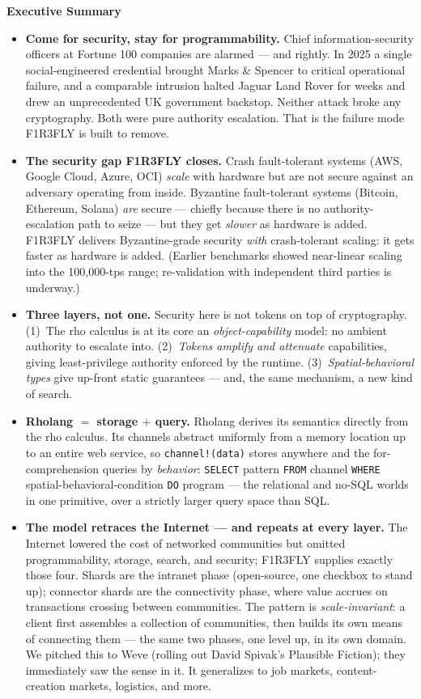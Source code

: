 \documentclass[11pt]{article}
\begin{document}
\begin{keybox}
\textbf{Executive Summary}
\begin{itemize}[leftmargin=1.2em, itemsep=4pt, topsep=4pt]
  \item \textbf{Come for security, stay for programmability.} Chief information-security officers at Fortune 100 companies are alarmed --- and rightly. In 2025 a single social-engineered credential brought Marks \& Spencer to critical operational failure, and a comparable intrusion halted Jaguar Land Rover for weeks and drew an unprecedented UK government backstop. Neither attack broke any cryptography. Both were pure authority escalation. That is the failure mode F1R3FLY is built to remove.
  \item \textbf{The security gap F1R3FLY closes.} Crash fault-tolerant systems (AWS, Google Cloud, Azure, OCI) \emph{scale} with hardware but are not secure against an adversary operating from inside. Byzantine fault-tolerant systems (Bitcoin, Ethereum, Solana) \emph{are} secure --- chiefly because there is no authority-escalation path to seize --- but they get \emph{slower} as hardware is added. F1R3FLY delivers Byzantine-grade security \emph{with} crash-tolerant scaling: it gets faster as hardware is added. (Earlier benchmarks showed near-linear scaling into the 100{,}000-tps range; re-validation with independent third parties is underway.)
  \item \textbf{Three layers, not one.} Security here is not tokens on top of cryptography. (1)~The rho calculus is at its core an \emph{object-capability} model: no ambient authority to escalate into. (2)~\emph{Tokens amplify and attenuate} capabilities, giving least-privilege authority enforced by the runtime. (3)~\emph{Spatial-behavioral types} give up-front static guarantees --- and, the same mechanism, a new kind of search.
  \item \textbf{Rholang $=$ storage $+$ query.} Rholang derives its semantics directly from the rho calculus. Its channels abstract uniformly from a memory location up to an entire web service, so \texttt{channel!(data)} stores anywhere and the for-comprehension queries by \emph{behavior}: \texttt{SELECT} pattern \texttt{FROM} channel \texttt{WHERE} spatial-behavioral-condition \texttt{DO} program --- the relational and no-SQL worlds in one primitive, over a strictly larger query space than SQL.
  \item \textbf{The model retraces the Internet --- and repeats at every layer.} The Internet lowered the cost of networked communities but omitted programmability, storage, search, and security; F1R3FLY supplies exactly those four. Shards are the intranet phase (open-source, one checkbox to stand up); connector shards are the connectivity phase, where value accrues on transactions crossing between communities. The pattern is \emph{scale-invariant}: a client first assembles a collection of communities, then builds its own means of connecting them --- the same two phases, one level up, in its own domain. We pitched this to Weve (rolling out David Spivak's Plausible Fiction); they immediately saw the sense in it. It generalizes to job markets, content-creation markets, logistics, and more.

\end{itemize}
\end{keybox}
\end{document}
